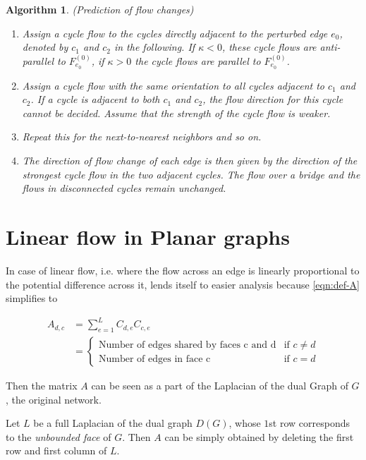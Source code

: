 \documentclass[10pt,aps,pra,twocolumn,superscriptaddress]{revtex4-1}
\newtheorem{alg}{Algorithm}
\begin{document}
\begin{alg}
\label{thm:alg1}
(Prediction of flow changes)
\begin{enumerate}
\item
Assign a cycle flow to the cycles directly adjacent to the perturbed edge $e_0$, denoted by $c_1$ and $c_2$ in the following. If $\kappa < 0$, these cycle flows are anti-parallel to $F^{(0)}_{e_0}$, if $\kappa > 0$ the cycle flows are parallel to $F^{(0)}_{e_0}$.
\item
Assign a cycle flow with the same orientation to all cycles adjacent to $c_1$ and $c_2$. If a cycle is adjacent to both $c_1$ and $c_2$, the flow direction for this cycle cannot be decided. Assume that the strength of the cycle flow is weaker. 
\item
Repeat this for the next-to-nearest neighbors and so on.
\item
The direction of flow change of each edge is then given by the direction of the strongest cycle flow in the two adjacent cycles. The flow over a bridge and the flows in disconnected cycles remain unchanged.
\end{enumerate}
\end{alg}




\section{Linear flow in Planar graphs}
\label{sec:linflow-planar}
In case of linear flow, i.e.  where the flow across an edge is linearly 
proportional to the potential difference across it, lends itself to easier 
analysis because \eqref{eqn:def-A} simplifies to

\begin{align}
   \label{eqn:lin-Lapldef}
   A_{d,c} &= \sum_{e=1}^L C_{d,e} C_{c,e} \\
           &=
	     \begin{cases}
	     \text{Number of edges shared by faces c and d} & \text{if } c\neq d\\
	     \text{Number of edges in face c} & \text{if } c=d
	     \end{cases}
\end{align}
	
Then the matrix $A$ can be seen as a part of the Laplacian of the dual Graph 
of $G$, the original network.  

Let $L$ be a full Laplacian of the dual graph $D(G)$, whose $1$st row 
corresponds to the \emph{unbounded face} of $G$.  Then $A$ can 
be simply obtained by deleting the first row and first column of $L$.  
\end{document}
